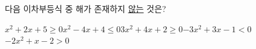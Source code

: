 다음 이차부등식 중 해가 존재하지 \underline{않는} 것은?
\begin{choicesv}{$x^2+2x+5\ge 0$}{$x^2-4x+4\le 0$}{$3x^2+4x+2\ge 0$}{$-3x^2+3x-1<0$}{$-2x^2+x-2>0$}\end{choicesv}
